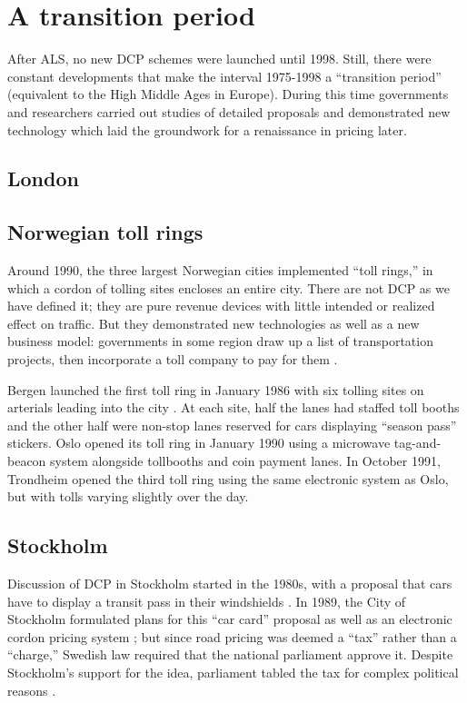 \section{A transition period}\label{sec:transition}

After ALS, no new DCP schemes were launched until 1998. Still, there were constant developments that make the interval 1975-1998 a ``transition period'' (equivalent to the High Middle Ages in Europe). During this time governments and researchers carried out studies of detailed proposals and demonstrated new technology which laid the groundwork for a renaissance in pricing later.

\subsection{London}



\subsection{Norwegian toll rings}

Around 1990, the three largest Norwegian cities implemented ``toll rings,'' in which a cordon of tolling sites encloses an entire city. There are not DCP as we have defined it; they are pure revenue devices with little intended or realized effect on traffic. But they demonstrated new technologies as well as a new business model: governments in some region draw up a list of transportation projects, then incorporate a toll company to pay for them \citep{Ieromonachou2006}. 

Bergen launched the first toll ring in January 1986 with six tolling sites on arterials leading into the city \citep{Ieromonachou2006,Ramjerdi2004}. At each site, half the lanes had staffed toll booths and the other half were non-stop lanes reserved for cars displaying ``season pass'' stickers. Oslo opened its toll ring in January 1990 using a microwave tag-and-beacon system alongside tollbooths and coin payment lanes. In October 1991, Trondheim opened the third toll ring using the same electronic system as Oslo, but with tolls varying slightly over the day.

 \subsection{Stockholm}

Discussion of DCP in Stockholm started in the 1980s, with a proposal that cars have to display a transit pass in their windshields \citep{GullbergIsaksson2009,Arnott2005}. In 1989, the City of Stockholm formulated plans for this ``car card'' proposal as well as an electronic cordon pricing system \citep[p. 90]{Hau1992}; but since road pricing was deemed a ``tax'' rather than a ``charge,'' Swedish law required that the national parliament approve it. Despite Stockholm's support for the idea, parliament tabled the tax for complex political reasons \citep{Ahlstrand2001}. 

